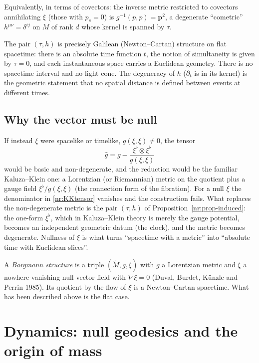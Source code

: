 Equivalently, in terms of covectors: the inverse metric restricted to covectors
annihilating $\xi$ (those with $p_s=0$) is $g^{-1}(p,p)=\mathbf{p}^2$, a
degenerate ``cometric'' $h^{\mu\nu}=\delta^{ij}$ on $M$ of rank $d$ whose kernel
is spanned by $\tau$.

The pair $(\tau,h)$ is precisely Galilean (Newton--Cartan) structure on flat
spacetime: there is an absolute time function $t$, the notion of
simultaneity is given by $\tau=0$, and each instantaneous space carries a
Euclidean geometry. There is no spacetime interval and no light cone. The
degeneracy of $h$ ($\partial_t$ is in its kernel) is the geometric statement
that no spatial distance is defined between events at different times.

\subsection{Why the vector must be null}

If instead $\xi$ were spacelike or timelike, $g(\xi,\xi)\neq0$, the tensor
\begin{equation}
  \hat g=g-\frac{\xi^\flat\otimes\xi^\flat}{g(\xi,\xi)}
  \label{nr:KKtensor}
\end{equation}
would be basic and non-degenerate, and the reduction would be the familiar
Kaluza--Klein one: a Lorentzian (or Riemannian) metric on the quotient plus a
gauge field $\xi^\flat/g(\xi,\xi)$ (the connection form of the fibration). For a
null $\xi$ the denominator in \eqref{nr:KKtensor} vanishes and the construction
fails. What replaces the non-degenerate metric is the pair $(\tau,h)$ of
Proposition~\ref{nr:prop-induced}: the one-form $\xi^\flat$, which in
Kaluza--Klein theory is merely the gauge potential, becomes an independent
geometric datum (the clock), and the metric becomes degenerate. Nullness of
$\xi$ is what turns ``spacetime with a metric'' into ``absolute time with
Euclidean slices''.

\begin{nrdef}
A \emph{Bargmann structure} is a triple $(\tilde M,g,\xi)$ with $g$ a Lorentzian
metric and $\xi$ a nowhere-vanishing null vector field with $\nabla\xi=0$
(Duval, Burdet, K\"unzle and Perrin 1985). Its quotient by the flow of $\xi$ is
a Newton--Cartan spacetime. What has been described above is the flat case.
\end{nrdef}

\section[Null geodesics and the origin of mass]{Dynamics: null geodesics and the origin of mass}
\label{sec:nr-dynamics}

